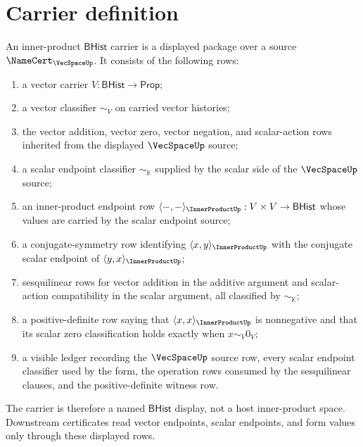 \section{Carrier definition}
\label{sec:innerproduct-carrier}

\begin{definition}
\label{def:innerproduct-bhist-carrier}
An inner-product $\mathsf{BHist}$ carrier is a displayed package over a
source $\NameCert_{\VecSpaceUp}$. It consists of the following rows:
\begin{enumerate}
  \item a vector carrier $V:\mathsf{BHist}\to\mathsf{Prop}$;
  \item a vector classifier $\sim_V$ on carried vector histories;
  \item the vector addition, vector zero, vector negation, and scalar-action
  rows inherited from the displayed $\VecSpaceUp$ source;
  \item a scalar endpoint classifier $\sim_{\mathbb{K}}$ supplied by the
  scalar side of the $\VecSpaceUp$ source;
  \item an inner-product endpoint row
  $\langle-,-\rangle_{\InnerProductUp}:V\times V\to\mathsf{BHist}$ whose
  values are carried by the scalar endpoint source;
  \item a conjugate-symmetry row identifying
  $\langle x,y\rangle_{\InnerProductUp}$ with the conjugate scalar endpoint
  of $\langle y,x\rangle_{\InnerProductUp}$;
  \item sesquilinear rows for vector addition in the additive argument and
  scalar-action compatibility in the scalar argument, all classified by
  $\sim_{\mathbb{K}}$;
  \item a positive-definite row saying that
  $\langle x,x\rangle_{\InnerProductUp}$ is nonnegative and that its scalar
  zero classification holds exactly when $x\sim_V 0_V$;
  \item a visible ledger recording the $\VecSpaceUp$ source row, every scalar
  endpoint classifier used by the form, the operation rows consumed by the
  sesquilinear clauses, and the positive-definite witness row.
\end{enumerate}
The carrier is therefore a named $\mathsf{BHist}$ display, not a host
inner-product space. Downstream certificates read vector endpoints, scalar
endpoints, and form values only through these displayed rows.
\end{definition}

